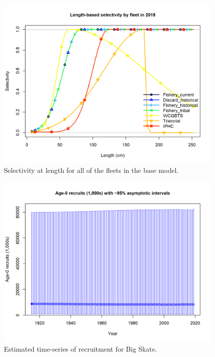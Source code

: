 \documentclass[12pt,]{article}
\begin{document}
\begin{figure}
\centering
\includegraphics{r4ss/plots_mod1/sel01_multiple_fleets_length1.png}
\caption{Selectivity at length for all of the fleets in the base model.
\label{fig:sel01_multiple_fleets_length1}}
\end{figure}

\FloatBarrier

\begin{figure}
\centering
\includegraphics{r4ss/plots_mod1/ts11_Age-0_recruits_(1000s)_with_95_asymptotic_intervals.png}
\caption{Estimated time-series of recruitment for Big Skate.
\label{fig:ts11_Age-0_recruits_(1000s)_with_95_asymptotic_intervals}}
\end{figure}
\end{document}
